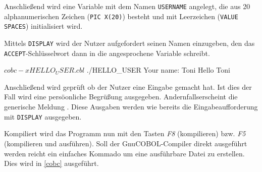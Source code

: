 Anschließend wird eine Variable mit dem Namen \texttt{USERNAME} angelegt, die aus 20 alphanumerischen Zeichen (\texttt{PIC X(20)}) besteht und mit Leerzeichen (\texttt{VALUE SPACES}) initialisiert wird.

Mittels \texttt{DISPLAY} wird der Nutzer aufgefordert seinen Namen einzugeben, den das \texttt{ACCEPT}-Schlüsselwort dann in die angesprochene Variable schreibt.

\begin{shellwindow}
$ cobc -x HELLO_USER.cbl
$ ./HELLO_USER
Your name: Toni
Hello Toni
\end{shellwindow}

Anschließend wird geprüft ob der Nutzer eine Eingabe gemacht hat. Ist dies der Fall wird eine persöonliche Begrüßung ausgegeben. Andernfallserscheint die generische Meldung . Diese Ausgaben werden wie bereits die Eingabeaufforderung mit \texttt{DISPLAY} ausgegeben.

Kompiliert wird das Programm nun mit den Tasten \textit{F8} (kompilieren) bzw. \textit{F5} (kompilieren und ausführen). Soll der GnuCOBOL-Compiler direkt ausgeführt werden reicht ein einfaches Kommado um eine ausführbare Datei zu erstellen. Dies wird in \autoref{cobc} ausgeführt.